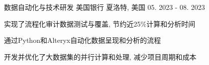\begin{cventries}
\begin{comment}
  \cventry
    {Interp-flow Hijacking: eBPF在内核中的控制流劫持}
    {导师: 申文博}
    {远程}
    {09. 2023 - 现在}
    {
      \begin{cvitems}
        \item {}
        \item {}
      \end{cvitems}
    }
  \end{comment}

  \begin{comment}
  \cventry
    {微服务Benchmarking}
    {导师Nikos Vasilakis}
    {普罗维登斯, 美国}
    {09. 2023 - 现在}
    {
      \begin{cvitems}
        \item {研究实际应用中的微服务架构, 并设计Benchmarking工具}
        \item {设计高效的微服务Benchmarking工具, 提升测试效率}
      \end{cvitems}
    }
  \end{comment}

  \cventry
    {数据自动化与技术研发}
    {美国银行}
    {夏洛特, 美国}
    {05. 2023 - 08. 2023}
    {
      \begin{cvitems}
        \item {实现了流程化审计数据测试与覆盖, 节约近25\%计算和分析时间}
        \item {通过Python和Alteryx自动化数据呈现和分析的流程}
        \item {开发并优化了大数据集的并行计算和处理, 减少项目周期和成本}
      \end{cvitems}
    }

  \begin{comment}
  \cventry
    {Machine Learning \& Computation}
    {Chemical Molecular Energy Optimization}
    {Providence, RI}
    {Aug 2022 - Present}
    {
      \begin{cvitems}
        \item {Analyzed traditional Hartree-Fock and DFT methods with Gaussian}
        \item {Implemented the original data pipeline on Brown's Oscar super computing cluster with 200x speed}
        \item {Working on an efficient Belief Propagation network based on HMC}
      \end{cvitems}
    }
  \end{comment}


\end{cventries}
